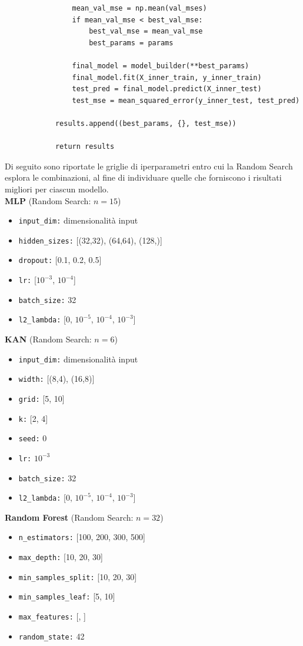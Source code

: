 \documentclass[a4paper,12pt]{report}
\begin{document}
\begin{verbatim}
				mean_val_mse = np.mean(val_mses)
				if mean_val_mse < best_val_mse:
					best_val_mse = mean_val_mse
					best_params = params
			
				final_model = model_builder(**best_params)
				final_model.fit(X_inner_train, y_inner_train)
				test_pred = final_model.predict(X_inner_test)
				test_mse = mean_squared_error(y_inner_test, test_pred)
			
			results.append((best_params, {}, test_mse))
			
			return results
	\end{verbatim}
	
	Di seguito sono riportate le griglie di iperparametri entro cui la Random Search esplora le combinazioni, al fine di individuare quelle che forniscono i risultati migliori per ciascun modello. \\
	\smallskip
	\noindent\textbf{MLP} \quad (Random Search: $n=15$)
	\begin{itemize}
		\item \texttt{input\_dim:} dimensionalità input
		\item \texttt{hidden\_sizes:} [(32,32), (64,64), (128,)]
		\item \texttt{dropout:} [0.1, 0.2, 0.5]
		\item \texttt{lr:} [$10^{-3}$, $10^{-4}$]
		\item \texttt{batch\_size:} 32
		\item \texttt{l2\_lambda:} [0, $10^{-5}$, $10^{-4}$, $10^{-3}$]
	\end{itemize}
	
	\smallskip
	\noindent\textbf{KAN} \quad (Random Search: $n=6$)
	\begin{itemize}
		\item \texttt{input\_dim:} dimensionalità input
		\item \texttt{width:} [(8,4), (16,8)]
		\item \texttt{grid:} [5, 10]
		\item \texttt{k:} [2, 4]
		\item \texttt{seed:} 0
		\item \texttt{lr:} $10^{-3}$
		\item \texttt{batch\_size:} 32
		\item \texttt{l2\_lambda:} [0, $10^{-5}$, $10^{-4}$, $10^{-3}$]
	\end{itemize}
	
	\smallskip
	\noindent\textbf{Random Forest} \quad (Random Search: $n=32$)
	\begin{itemize}
		\item \texttt{n\_estimators:} [100, 200, 300, 500]
		\item \texttt{max\_depth:} [10, 20, 30]
		\item \texttt{min\_samples\_split:} [10, 20, 30]
		\item \texttt{min\_samples\_leaf:} [5, 10]
		\item \texttt{max\_features:} [, ]
		\item \texttt{random\_state:} 42
	\end{itemize}
	
\end{document}
